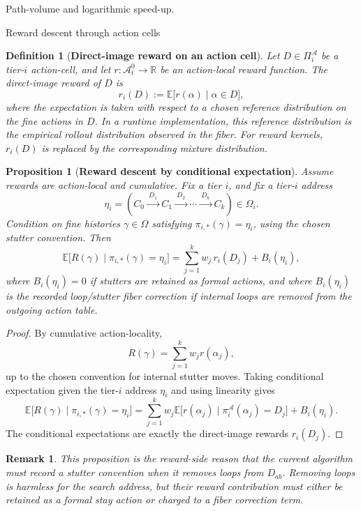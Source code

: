 \documentclass[11pt]{article}
\newtheorem{definition}[subsubsection]{Definition}
\newtheorem{remark}[subsubsection]{Remark}
\newtheorem{proposition}[subsubsection]{Proposition}
\newcommand{\E}{\mathbb{E}}
\newcommand{\R}{\mathbb{R}}
\begin{document}
\begin{section}{Path-volume and logarithmic speed-up.}
\begin{subsection}{Reward descent through action cells}
\begin{definition}[{\bf Direct-image reward on an action cell}]\label{def:direct-image-action-cell-reward}
\normalfont
Let $D\in\Pi_i^{\mathcal A}$ be a tier-$i$ action-cell, and let $r:\mathcal{A}_t^0\to\R$ be an action-local reward function. The direct-image reward of $D$ is
$$
r_i(D)
:=
\E\bigl[r(\alpha)\mid \alpha\in D\bigr],
$$
where the expectation is taken with respect to a chosen reference distribution on the fine actions in $D$. In a runtime implementation, this reference distribution is the empirical rollout distribution observed in the fiber. For reward kernels, $r_i(D)$ is replaced by the corresponding mixture distribution.
\end{definition}

\begin{proposition}[{\bf Reward descent by conditional expectation}]\label{prop:reward-descent-partition}
Assume rewards are action-local and cumulative. Fix a tier $i$, and fix a tier-$i$ address
$$
\eta_i
=
\left(
C_0\xrightarrow{\ D_1\ }C_1
\xrightarrow{\ D_2\ }\cdots
\xrightarrow{\ D_k\ }C_k
\right)
\in\Omega_i.
$$
Condition on fine histories $\gamma\in\Omega$ satisfying $\pi_{i,*}(\gamma)=\eta_i$, using the chosen stutter convention. Then
$$
\E\bigl[R(\gamma)\mid \pi_{i,*}(\gamma)=\eta_i\bigr]
=
\sum_{j=1}^{k}w_j\,r_i(D_j)
+B_i(\eta_i),
$$
where $B_i(\eta_i)=0$ if stutters are retained as formal actions, and where $B_i(\eta_i)$ is the recorded loop/stutter fiber correction if internal loops are removed from the outgoing action table.
\end{proposition}

\begin{proof}
By cumulative action-locality,
$$
R(\gamma)=\sum_{j=1}^{k}w_jr(\alpha_j),
$$
up to the chosen convention for internal stutter moves. Taking conditional expectation given the tier-$i$ address $\eta_i$ and using linearity gives
$$
\E\bigl[R(\gamma)\mid \pi_{i,*}(\gamma)=\eta_i\bigr]
=
\sum_{j=1}^{k}w_j
\E\bigl[r(\alpha_j)\mid \pi_i^{\mathcal A}(\alpha_j)=D_j\bigr]
+B_i(\eta_i).
$$
The conditional expectations are exactly the direct-image rewards $r_i(D_j)$.
\end{proof}

\begin{remark}
\normalfont
This proposition is the reward-side reason that the current algorithm must record a stutter convention when it removes loops from $D_{ab}$. Removing loops is harmless for the search address, but their reward contribution must either be retained as a formal stay action or charged to a fiber correction term.
\end{remark}


\end{subsection}
\end{section}
\end{document}
